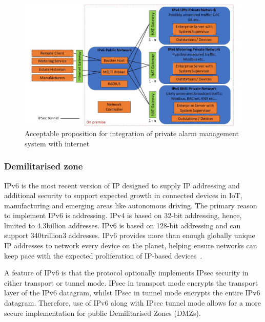 \documentclass[11pt, oneside]{book}   	%
\begin{document}
\pagebreak

\FloatBarrier
\begin{figure}
\begin{center}
\includegraphics[width=1\textwidth]{acceptablePublicNetwork.jpg}
\caption{Acceptable proposition for integration of private alarm management system with internet}
\label{Integrated Network Configuration figure}
\end{center}
\end{figure}
\FloatBarrier

\pagebreak

\subsubsection{Demilitarised zone}
IPv6 is the most recent version of IP designed to supply IP addressing and additional security to support expected growth in connected devices in IoT, manufacturing and emerging areas like autonomous driving.
The primary reason to implement IPv6 is addressing. 
IPv4 is based on 32-bit addressing, hence, limited to 4.3billion addresses.
IPv6 is based on 128-bit addressing and can support 340trillion3 addresses.
IPv6 provides more than enough globally unique IP addresses to network every device on the planet, helping ensure networks can keep pace with the expected proliferation of IP-based devices~\cite{ipv6}.\

A feature of IPv6 is that the protocol optionally implements IPsec security in either transport or tunnel mode.
IPsec in transport mode encrypts the transport layer of the IPv6 datagram, whilst IPsec in tunnel mode encrypts the entire IPv6 datagram.
Therefore, use of IPv6 along with IPsec tunnel mode allows for a more secure implementation for public Demilitarised Zones (DMZs).\
\end{document}
